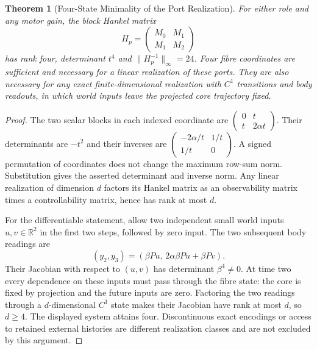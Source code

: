 \documentclass[11pt,a4paper]{article}
\newtheorem{theorem}{Theorem}[section]
\theoremstyle{definition}
\begin{document}
\begin{theorem}[Four-State Minimality of the Port Realization]\label{thm:bridge-port-minimality}
For either role and any motor gain, the block Hankel matrix
\[
 H_p=\begin{pmatrix}M_0&M_1\\M_1&M_2\end{pmatrix}
\]
has rank four, determinant $t^4$ and $\|H_p^{-1}\|_\infty=24$. Four fibre coordinates are sufficient and necessary for a linear realization of these ports. They are also necessary for any exact finite-dimensional realization with $C^1$ transitions and body readouts, in which world inputs leave the projected core trajectory fixed.
\end{theorem}
\begin{proof}
The two scalar blocks in each indexed coordinate are $\left(\begin{smallmatrix}0&t\\t&2\alpha t\end{smallmatrix}\right)$. Their determinants are $-t^2$ and their inverses are $\left(\begin{smallmatrix}-2\alpha/t&1/t\\1/t&0\end{smallmatrix}\right)$. A signed permutation of coordinates does not change the maximum row-sum norm. Substitution gives the asserted determinant and inverse norm. Any linear realization of dimension $d$ factors its Hankel matrix as an observability matrix times a controllability matrix, hence has rank at most $d$.

For the differentiable statement, allow two independent small world inputs $u,v\in\mathbb R^2$ in the first two steps, followed by zero input. The two subsequent body readings are
\[
 (y_2,y_3)=(\beta P u,\,2\alpha\beta P u+\beta P v).
\]
Their Jacobian with respect to $(u,v)$ has determinant $\beta^4\ne0$. At time two every dependence on these inputs must pass through the fibre state: the core is fixed by projection and the future inputs are zero. Factoring the two readings through a $d$-dimensional $C^1$ state makes their Jacobian have rank at most $d$, so $d\ge4$. The displayed system attains four. Discontinuous exact encodings or access to retained external histories are different realization classes and are not excluded by this argument.
\end{proof}
\end{document}
